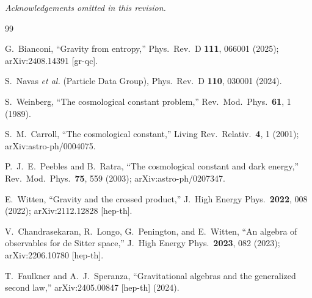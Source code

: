 \documentclass[aps,prd,twocolumn,preprintnumbers,superscriptaddress]{revtex4-2}
\begin{document}
\textit{Acknowledgements omitted in this revision.}


\begin{thebibliography}{99}

G.~Bianconi,
``Gravity from entropy,''
Phys.\ Rev.\ D \textbf{111}, 066001 (2025);
arXiv:2408.14391 [gr-qc].

S.~Navas \textit{et al.} (Particle Data Group),
Phys.\ Rev.\ D \textbf{110}, 030001 (2024).

S.~Weinberg,
``The cosmological constant problem,''
Rev.\ Mod.\ Phys.\ \textbf{61}, 1 (1989).

S.~M.~Carroll,
``The cosmological constant,''
Living Rev.\ Relativ.\ \textbf{4}, 1 (2001);
arXiv:astro-ph/0004075.

P.~J.~E.~Peebles and B.~Ratra,
``The cosmological constant and dark energy,''
Rev.\ Mod.\ Phys.\ \textbf{75}, 559 (2003);
arXiv:astro-ph/0207347.

E.~Witten,
``Gravity and the crossed product,''
J.\ High Energy Phys.\ \textbf{2022}, 008 (2022);
arXiv:2112.12828 [hep-th].

V.~Chandrasekaran, R.~Longo, G.~Penington, and E.~Witten,
``An algebra of observables for de Sitter space,''
J.\ High Energy Phys.\ \textbf{2023}, 082 (2023);
arXiv:2206.10780 [hep-th].

T.~Faulkner and A.~J.~Speranza,
``Gravitational algebras and the generalized second law,''
arXiv:2405.00847 [hep-th] (2024).


\end{thebibliography}
\end{document}
